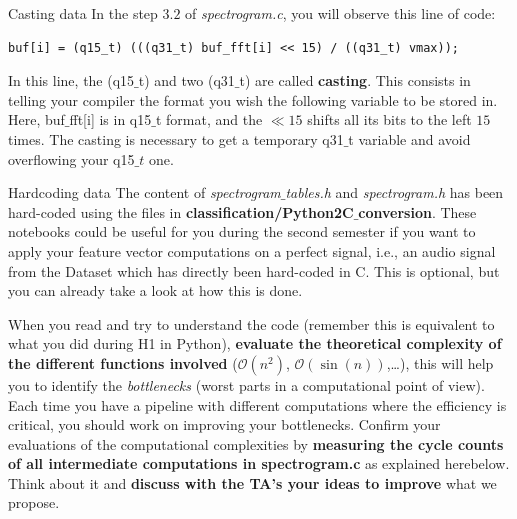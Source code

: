 \begin{bclogo}[couleur = gray!20, arrondi = 0.2, logo=\bcinfo]{Casting data}
%
In the step $3.2$ of \emph{spectrogram.c}, you will observe this line of code:
%
\begin{lstlisting}
buf[i] = (q15_t) (((q31_t) buf_fft[i] << 15) / ((q31_t) vmax));
\end{lstlisting}
%
In this line, the (q15$\_$t) and two (q31$\_$t) are called \textbf{casting}. This consists in telling your compiler the format you wish the following variable to be stored in. Here, buf$\_$fft[i] is in q15$\_$t format, and the $\ll 15$ shifts all its bits to the left $15$ times. The casting is necessary to get a temporary q31$\_$t variable and avoid overflowing your q15$\_t$ one.
%
\end{bclogo}
%
\begin{bclogo}[couleur = gray!20, arrondi = 0.2, logo=\bcinfo]{Hardcoding data}
The content of \emph{spectrogram$\_$tables.h} and \emph{spectrogram.h} has been hard-coded using the files in \textbf{classification/Python2C$\_$conversion}. These notebooks could be useful for you during the second semester if you want to apply your feature vector computations on a perfect signal, i.e., an audio signal from the Dataset which has directly been hard-coded in C. This is optional, but you can already take a look at how this is done.
\end{bclogo}
%
When you read and try to understand the code (remember this is equivalent to what you did during H1 in Python), \textbf{evaluate the theoretical complexity of the different functions involved} ($\mathcal O(n^2)$, $\mathcal O(\sin (n))$,\ldots), this will help you to identify the \emph{bottlenecks} (worst parts in a computational point of view). Each time you have a pipeline with different computations where the efficiency is critical, you should work on improving your bottlenecks. Confirm your evaluations of the computational complexities by \textbf{measuring the cycle counts of all intermediate computations in spectrogram.c} as explained herebelow.
Think about it and \textbf{discuss with the TA's your ideas to improve} what we propose. \\

